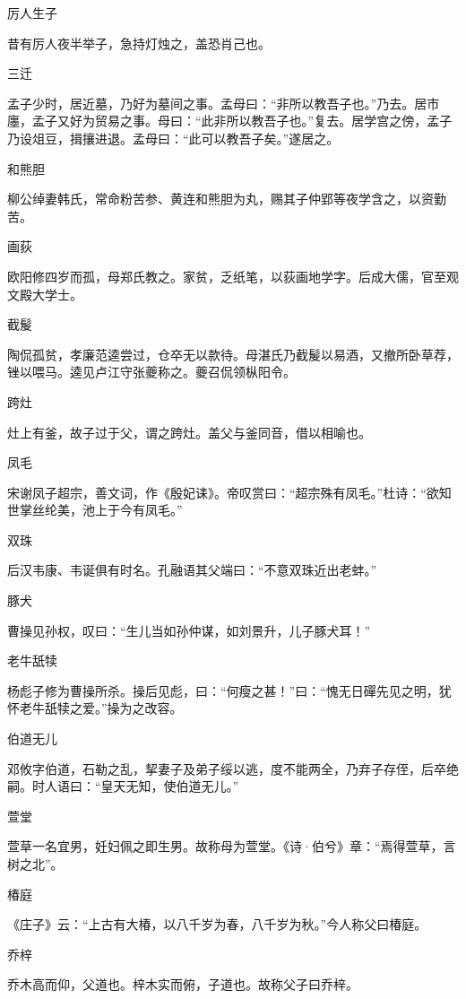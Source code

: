 \documentclass[a4paper,12pt,UTF8,twoside]{ctexbook}
\begin{document}
    厉人生子
    
    昔有厉人夜半举子，急持灯烛之，盖恐肖己也。
    
    三迁
    
    孟子少时，居近墓，乃好为墓间之事。孟母曰：“非所以教吾子也。”乃去。居市廛，孟子又好为贸易之事。母曰：“此非所以教吾子也。”复去。居学宫之傍，孟子乃设俎豆，揖攘进退。孟母曰：“此可以教吾子矣。”遂居之。
    
    和熊胆
    
    柳公绰妻韩氏，常命粉苦参、黄连和熊胆为丸，赐其子仲郢等夜学含之，以资勤苦。
    
    画荻
    
    欧阳修四岁而孤，母郑氏教之。家贫，乏纸笔，以荻画地学字。后成大儒，官至观文殿大学士。
    
    截髲
    
    陶侃孤贫，孝廉范逵尝过，仓卒无以款待。母湛氏乃截髲以易酒，又撤所卧草荐，锉以喂马。逵见卢江守张夔称之。夔召侃领枞阳令。
    
    跨灶
    
    灶上有釜，故子过于父，谓之跨灶。盖父与釜同音，借以相喻也。
    
    凤毛
    
    宋谢凤子超宗，善文词，作《殷妃诔》。帝叹赏曰：“超宗殊有凤毛。”杜诗：“欲知世掌丝纶美，池上于今有凤毛。”
    
    双珠
    
    后汉韦康、韦诞俱有时名。孔融语其父端曰：“不意双珠近出老蚌。”
    
    豚犬
    
    曹操见孙权，叹曰：“生儿当如孙仲谋，如刘景升，儿子豚犬耳！”
    
    老牛舐犊
    
    杨彪子修为曹操所杀。操后见彪，曰：“何瘦之甚！”曰：“愧无日磾先见之明，犹怀老牛舐犊之爱。”操为之改容。
    
    伯道无儿
    
    邓攸字伯道，石勒之乱，挈妻子及弟子绥以逃，度不能两全，乃弃子存侄，后卒绝嗣。时人语曰：“皇天无知，使伯道无儿。”
    
    萱堂
    
    萱草一名宜男，妊妇佩之即生男。故称母为萱堂。《诗·伯兮》章：“焉得萱草，言树之北”。
    
    椿庭
    
    《庄子》云：“上古有大椿，以八千岁为春，八千岁为秋。”今人称父曰椿庭。
    
    乔梓
    
    乔木高而仰，父道也。梓木实而俯，子道也。故称父子曰乔梓。
    
\end{document}
